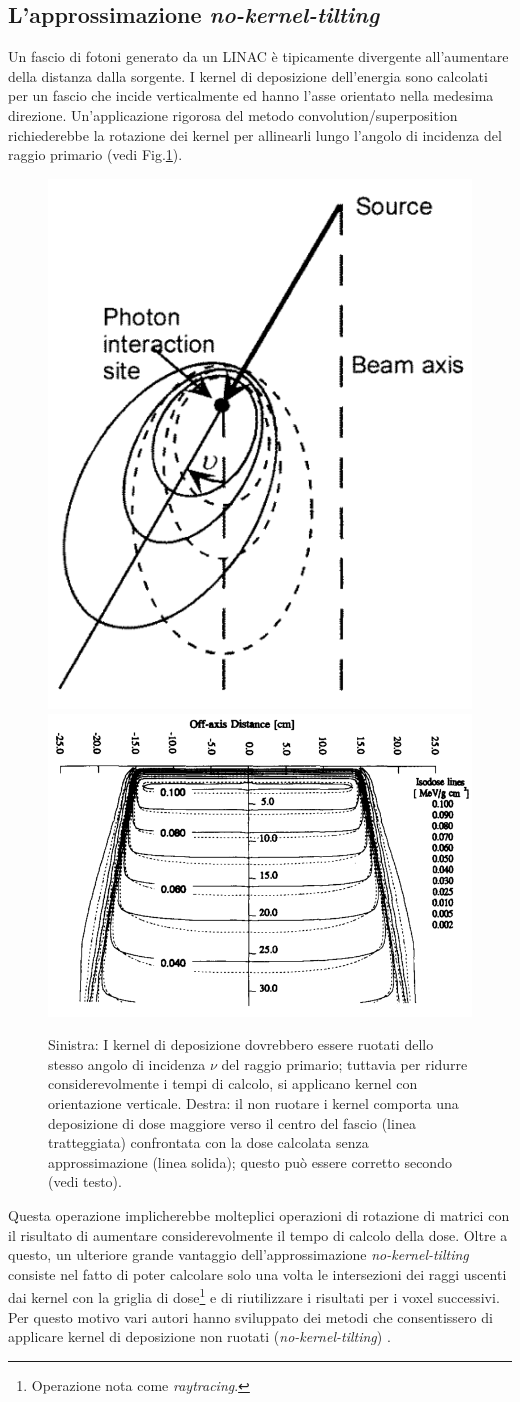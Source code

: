 {\subsection{L'approssimazione \textit{no-kernel-tilting}}
Un fascio di fotoni generato da un LINAC è tipicamente divergente all'aumentare della distanza dalla sorgente. I kernel di deposizione dell'energia sono calcolati per un fascio che incide verticalmente ed hanno l'asse orientato nella medesima direzione. Un'applicazione rigorosa del metodo convolution/superposition richiederebbe la rotazione dei kernel per allinearli lungo l'angolo di incidenza del raggio primario (vedi Fig.\ref{fig:kern_tilt}).\\
\begin{figure}
\centering
\includegraphics[width=.35\textwidth]{./cap1/kern_tilt.png}
\includegraphics[width=.6\textwidth]{./cap1/kern_tilt_b.png}
\caption{Sinistra: I kernel di deposizione dovrebbero essere ruotati dello stesso angolo di incidenza $\nu$ del raggio primario; tuttavia per ridurre considerevolmente i tempi di calcolo, si applicano kernel con orientazione verticale. Destra: il non ruotare i kernel comporta una deposizione di dose maggiore verso il centro del fascio (linea tratteggiata) confrontata con la dose calcolata senza approssimazione (linea solida); questo può essere corretto secondo \cite{Papanikolaou1993} (vedi testo).} 
\label{fig:kern_tilt}
\end{figure}
Questa operazione implicherebbe molteplici operazioni di rotazione di matrici \cite{Sharpe1997} con il risultato di aumentare considerevolmente il tempo di calcolo della dose. Oltre a questo, un ulteriore grande vantaggio dell'approssimazione \textit{no-kernel-tilting} consiste nel fatto di poter calcolare solo una volta le intersezioni dei raggi uscenti dai kernel con la griglia di dose\footnote{Operazione nota come \textit{raytracing}.} e di riutilizzare i risultati per i voxel successivi. Per questo motivo vari autori hanno sviluppato dei metodi che consentissero di applicare kernel di deposizione non ruotati (\textit{no-kernel-tilting}) \cite{Sharpe1997,Papanikolaou1993}.

}
